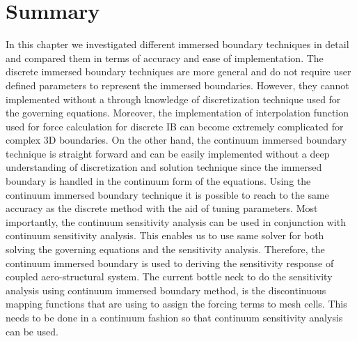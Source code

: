 \section{Summary}
In this chapter we investigated different immersed boundary techniques in detail and compared them in terms of accuracy and ease of implementation. The discrete immersed boundary techniques are more general and do not require user defined parameters to represent the immersed boundaries. However, they cannot implemented without a through knowledge of discretization technique used for the governing equations. Moreover, the implementation of interpolation function used for force calculation for discrete IB can become extremely complicated for complex 3D boundaries. On the other hand, the continuum immersed boundary technique is straight forward and can be easily implemented without a deep understanding of discretization and solution technique since the immersed boundary is handled in the continuum form of the equations. Using the continuum immersed boundary technique it is possible to reach to the same accuracy as the discrete method with the aid of tuning parameters. Most importantly, the continuum sensitivity analysis can be used in conjunction with continuum sensitivity analysis. This enables us to use same solver for both solving the governing equations and the sensitivity analysis. Therefore, the continuum immersed boundary is used to deriving the sensitivity response of coupled aero-structural system. The current bottle neck to do the sensitivity analysis using continuum immersed boundary method, is the discontinuous mapping functions that are using to assign the forcing terms to mesh cells. This needs to be done in a continuum fashion so that continuum sensitivity analysis can be used.